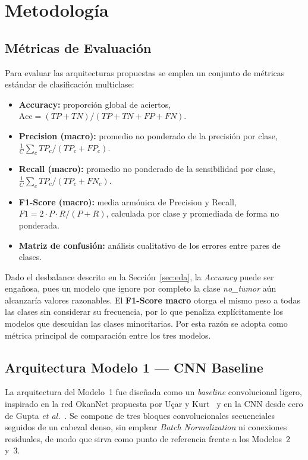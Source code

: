 \section{Metodología}

\subsection{Métricas de Evaluación}
Para evaluar las arquitecturas propuestas se emplea un conjunto
de métricas estándar de clasificación multiclase:

\begin{itemize}
  \item \textbf{Accuracy:} proporción global de aciertos,
        $\text{Acc} = (TP+TN)/(TP+TN+FP+FN)$.
  \item \textbf{Precision (macro):} promedio no ponderado de la
        precisión por clase,
        $\tfrac{1}{C}\sum_{c} TP_c/(TP_c+FP_c)$.
  \item \textbf{Recall (macro):} promedio no ponderado de la
        sensibilidad por clase,
        $\tfrac{1}{C}\sum_{c} TP_c/(TP_c+FN_c)$.
  \item \textbf{F1-Score (macro):} media armónica de Precision y
        Recall, $F1 = 2 \cdot P \cdot R / (P+R)$, calculada por
        clase y promediada de forma no ponderada.
  \item \textbf{Matriz de confusión:} análisis cualitativo de
        los errores entre pares de clases.
\end{itemize}

Dado el desbalance descrito en la Sección~\ref{sec:eda}, la
\textit{Accuracy} puede ser engañosa, pues un modelo que ignore
por completo la clase \textit{no\_tumor} aún alcanzaría valores
razonables. El \textbf{F1-Score macro} otorga el mismo peso a
todas las clases sin considerar su frecuencia, por lo que
penaliza explícitamente los modelos que descuidan las clases
minoritarias. Por esta razón se adopta como métrica principal
de comparación entre los tres modelos.

\subsection{Arquitectura Modelo 1 --- CNN Baseline}
\label{sec:arq-m1}

La arquitectura del Modelo~1 fue diseñada como un \textit{baseline}
convolucional ligero, inspirado en la red OkanNet propuesta por
Uçar y Kurt~\cite{okannet2026} y en la CNN desde cero de Gupta
\textit{et al.}~\cite{gupta2023}. Se compone de tres bloques
convolucionales secuenciales seguidos de un cabezal denso, sin
emplear \textit{Batch Normalization} ni conexiones residuales, de
modo que sirva como punto de referencia frente a los Modelos~2
y~3.

